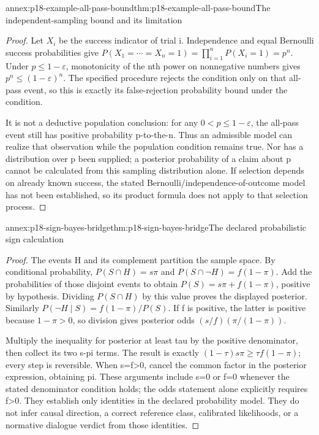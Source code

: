 \begin{annexitem}{annex:p18-example-all-pass-bound}{thm:p18-example-all-pass-bound}{The independent-sampling bound and its limitation}
\begin{proof}
Let \(X_i\) be the success indicator of trial i. Independence and equal
Bernoulli success probabilities give
\(P(X_1=\cdots=X_n=1)=\prod_{i=1}^{n}P(X_i=1)=p^n\).
Under \(p\leq1-\varepsilon\), monotonicity of the nth power on
nonnegative numbers gives \(p^n\leq(1-\varepsilon)^n\).
The specified procedure rejects the condition only on that all-pass event,
so this is exactly its false-rejection probability bound under the condition.

It is not a deductive population conclusion: for any
\(0<p\leq1-\varepsilon\), the all-pass event still has positive
probability p-to-the-n. Thus an admissible model can realize that observation
while the population condition remains true. Nor has a distribution over p
been supplied; a posterior probability of a claim about p cannot be calculated
from this sampling distribution alone. If selection depends on already known
success, the stated Bernoulli/independence-of-outcome model has not been
established, so its product formula does not apply to that selection process.
\end{proof}
\end{annexitem}

\begin{annexitem}{annex:p18-sign-bayes-bridge}{thm:p18-sign-bayes-bridge}{The declared probabilistic sign calculation}
\begin{proof}
The events H and its complement partition the sample space. By conditional
probability, \(P(S\cap H)=s\pi\) and
\(P(S\cap\neg H)=f(1-\pi)\). Add the probabilities of those disjoint
events to obtain \(P(S)=s\pi+f(1-\pi)\), positive by hypothesis.
Dividing \(P(S\cap H)\) by this value proves the displayed posterior.
Similarly \(P(\neg H\mid S)=f(1-\pi)/P(S)\). If f is positive,
the latter is positive because \(1-\pi>0\), so division gives
posterior odds \((s/f)(\pi/(1-\pi))\).

Multiply the inequality for posterior at least tau by the positive
denominator, then collect its two s-pi terms. The result is exactly
\((1-\tau)s\pi\geq\tau f(1-\pi)\); every step is reversible.
When s=f>0, cancel the common factor in the posterior expression,
obtaining pi. These arguments include s=0 or f=0 whenever the stated
denominator condition holds; the odds statement alone explicitly requires
f>0. They establish only identities in the declared probability model.
They do not infer causal direction, a correct reference class, calibrated
likelihoods, or a normative dialogue verdict from those identities.
\end{proof}
\end{annexitem}

